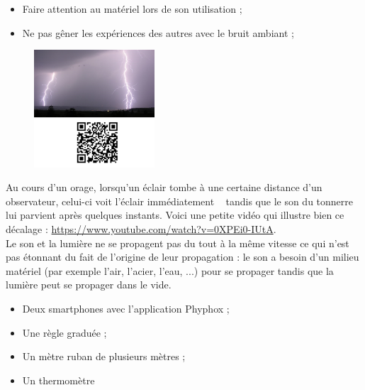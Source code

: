 \begin{tcolorbox}[colback=red!5!white,colframe=red!75!black,title= Consignes :]
\begin{itemize}
    \item Faire attention au matériel lors de son utilisation ;
    \item Ne pas gêner les expériences des autres avec le bruit ambiant ;
\end{itemize}
\end{tcolorbox}


\begin{tcolorbox}[colback=orange!5!white,colframe=orange!75!black,title= Scénario:]
\begin{figure}
\vspace{-0.6cm}
    \centering
     \includegraphics[width=0.4\textwidth]{Images/Orage.png}
   \end{figure}
Au cours d'un orage, lorsqu'un éclair tombe à une certaine distance d'un observateur, celui-ci voit l'éclair \og immédiatement \fg~ tandis que le son du tonnerre lui parvient après quelques instants. Voici une petite vidéo qui illustre bien ce décalage : \url{https://www.youtube.com/watch?v=0XPEi0-IUtA}.\\
Le son et la lumière ne se propagent pas du tout à la même vitesse ce qui n'est pas étonnant du fait de l'origine de leur propagation : le son a besoin d'un milieu matériel (par exemple l'air, l'acier, l'eau, ...) pour se propager tandis que la lumière peut se propager dans le vide.\\

\end{tcolorbox}


\begin{mdframed}[style=autreexo]
\textbf{}
\begin{itemize}
    \item Deux smartphones avec l'application Phyphox ;
    \item Une règle graduée ;
    \item Un mètre ruban de plusieurs mètres ;
    \item Un thermomètre
\end{itemize}
\end{mdframed}
 

